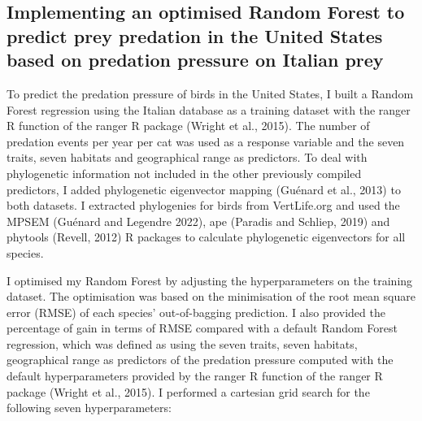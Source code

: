 \documentclass[
  super,
  review,
  3p]{elsarticle}
\begin{document}
\hypertarget{implementing-an-optimised-random-forest-to-predict-prey-predation-in-the-united-states-based-on-predation-pressure-on-italian-prey}{%
\subsection{Implementing an optimised Random Forest to predict prey
predation in the United States based on predation pressure on Italian
prey}\label{implementing-an-optimised-random-forest-to-predict-prey-predation-in-the-united-states-based-on-predation-pressure-on-italian-prey}}

To predict the predation pressure of birds in the United States, I built
a Random Forest regression using the Italian database as a training
dataset with the ranger R function of the ranger R package (Wright et
al., 2015). The number of predation events per year per cat was used as
a response variable and the seven traits, seven habitats and
geographical range as predictors. To deal with phylogenetic information
not included in the other previously compiled predictors, I added
phylogenetic eigenvector mapping (Guénard et al., 2013) to both
datasets. I extracted phylogenies for birds from VertLife.org and used
the MPSEM (Guénard and Legendre 2022), ape (Paradis and Schliep, 2019)
and phytools (Revell, 2012) R packages to calculate phylogenetic
eigenvectors for all species.

I optimised my Random Forest by adjusting the hyperparameters on the
training dataset. The optimisation was based on the minimisation of the
root mean square error (RMSE) of each species' out-of-bagging
prediction. I also provided the percentage of gain in terms of RMSE
compared with a default Random Forest regression, which was defined as
using the seven traits, seven habitats, geographical range as predictors
of the predation pressure computed with the default hyperparameters
provided by the ranger R function of the ranger R package (Wright et
al., 2015). I performed a cartesian grid search for the following seven
hyperparameters:
\end{document}
